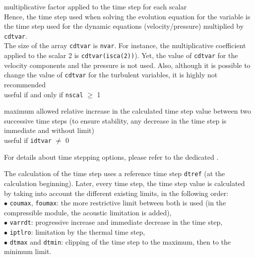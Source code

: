{multiplicative factor applied to the time step for each scalar\\
Hence, the time step used when solving the evolution equation for the
variable is the time step used for the dynamic equations (velocity/pressure)
multiplied by {\tt cdtvar}.\\
The size of the array {\tt cdtvar} is {\tt nvar}. For instance, the multiplicative
coefficient applied to the scalar 2 is {\tt cdtvar(isca(2))}). Yet, the value of
{\tt cdtvar} for the velocity components and the pressure is not used. Also,
although it is possible to change the value of {\tt cdtvar} for the turbulent
variables, it is highly not recommended\\
useful if and only if {\tt nscal} $\geqslant$ 1}

{maximum allowed relative increase in the calculated time step value
between two successive time steps (to ensure stability, any decrease in the time step
is immediate and without limit)\\
useful if {\tt idtvar} $\ne$ 0}

For details about time stepping options, please refer to the
dedicated .

The calculation of the time step uses a reference time step {\tt dtref} (at
the calculation beginning). Later, every time step, the time step value
is calculated by taking into account the different existing limits, in
the following order: \\
\hspace*{1.cm}$\bullet$ {\tt coumax}, {\tt foumax}: the more restrictive limit between
both is used (in the compressible module, the acoustic limitation is added),\\
\hspace*{1.cm}$\bullet$ {\tt varrdt}:  progressive increase and immediate
decrease in the time step,\\
\hspace*{1.cm}$\bullet$ {\tt iptlro}: limitation by the thermal time step,\\
\hspace*{1.cm}$\bullet$ {\tt dtmax} and {\tt dtmin}: clipping of the time step to
the maximum, then to the minimum limit.\\


